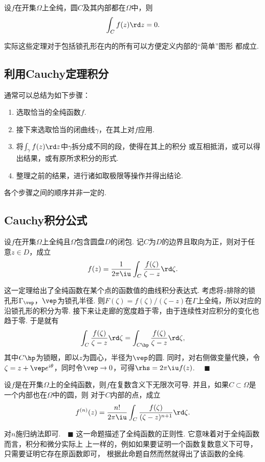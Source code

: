   \begin{cor}
    \label{cor: Cauchy定理}
    设$f$在开集$\Omega$上全纯，圆$C$及其内部都在$\Omega$中，则
    \[
      \int_C f(z)\rd z = 0.
    \]
  \end{cor}
  \remark
    实际这些定理对于包括锁孔形在内的所有可以方便定义内部的“简单”图形
    都成立.

\subsection{利用Cauchy定理积分}

  通常可以总结为如下步骤：
  \begin{enumerate}
    \item 选取恰当的全纯函数$f$.
    \item 接下来选取恰当的闭曲线$\gamma$，在其上对$f$应用.
    \item 将$\int_\gamma f(z)\rd z$中$\gamma$拆分成不同的段，使得在其上的积分
      或互相抵消，或可以得出结果，或有原所求积分的形式.
    \item 整理之前的结果，进行诸如取极限等操作并得出结论.
  \end{enumerate}
  各个步骤之间的顺序并非一定的.

\subsection{Cauchy积分公式}

  \begin{thm}[Cauchy]
    \label{thm: Cauchy公式}
    设$f$在开集$\Omega$上全纯且$\Omega$包含圆盘$D$的闭包.
    记$C$为$D$的边界且取向为正，则对于任意$z\in D$，成立
    \[
      f(z) = \frac{1}{2\pi\iu}\int_C\frac{f(\zeta)}{\zeta-z}\rd\zeta.
    \]
  \end{thm}
  \remark
    这一定理给出了全纯函数在某个点的函数值的曲线积分表达式.
  \proof
    考虑将$z$排除的锁孔形$\Gamma_{\vep}$，$\vep$为锁孔半径. 则$F(\zeta)
    =f(\zeta)/(\zeta-z)$在$\Gamma$上全纯，所以对应的沿锁孔形的积分为零.
    接下来让走廊的宽度趋于零，由于连续性对应积分的变化也趋于零. 于是就有
    \[
      \int_C \frac{f(\zeta)}{\zeta-z}\rd\zeta
      = \int_{C\hp}\frac{f(\zeta)}{\zeta-z}\rd\zeta,
    \]
    其中$C\hp$为锁眼，即以$z$为圆心，半径为$\vep$的圆. 同时，对右侧做变量代换，令
    $\zeta = z+\vep e^{i\theta}$，同时令$\vep\to 0$，可得$\rhs=2\pi\iu f(z)$.
    $\quad\blacksquare$

  \begin{cor}[Cauchy]
    \label{cor: Cauchy}
    设$f$是在开集$\Omega$上的全纯函数，则$f$在复数含义下无限次可导.
    并且，如果$C\subset\Omega$是一个内部也在$\Omega$中的圆，则
    对于$C$内部的点，成立
    \[
      f^{(n)}(z) = \frac{n!}{2\pi\iu}\int_C\frac{f(\zeta)}{(\zeta-z)^{n+1}}\rd\zeta.
    \]
  \end{cor}
  \proof
    对$n$施归纳法即可.$\quad\blacksquare$
  \remark
    这一命题描述了全纯函数的正则性. 它意味着对于全纯函数而言，积分和微分实际上
    上一样的，例如如果要证明一个函数复数意义下可导，只需要证明它存在原函数即可，
    根据此命题自然而然就得出了该函数的全纯.

